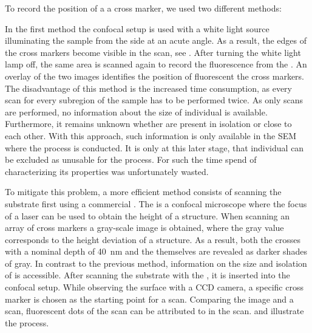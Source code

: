 		To record the position of a \nd \wrt a cross marker, we used two different methods:

		In the first method the confocal setup is used with a white light source illuminating the sample from the side at an acute angle. As a result, the edges of the cross markers become visible in the \fl scan, see . After turning the white light lamp off, the same area is scanned again to record the fluorescence from the \sivs. An overlay of the two images identifies the position of fluorescent \sivs \wrt the cross markers. The disadvantage of this method is the increased time consumption, as every scan for every subregion of the sample has to be performed twice. As only \fl scans are performed, no information about the size of individual \nds is available. Furthermore, it remains unknown whether \nds are present in isolation or close to each other. With this approach, such information is only available in the SEM where the \pp process is conducted. It is only at this later stage, that individual \nds can be excluded as unusable for the \pp process. For such \nds the time spend of characterizing its properties was unfortunately wasted.
		
		To mitigate this problem, a more efficient method consists of scanning the substrate first using a commercial \lsm. The \lsm is a confocal microscope where the focus of a laser can be used to obtain the height of a structure. When scanning an array of cross markers a gray-scale image is obtained, where the gray value corresponds to the height deviation of a structure. As a result, both the crosses with a nominal depth of \SI{40}{\nm} and the \nds themselves are revealed as darker shades of gray. In contrast to the previous method, information on the size and isolation of \nds is accessible. After scanning the substrate with the \lsm, it is inserted into the confocal setup. While observing the surface with a CCD camera, a specific cross marker is chosen as the starting point for a \fl scan. Comparing the \lsm image and a \fl scan, fluorescent dots of the \fl scan can be attributed to \nds in the \lsm scan.  and  illustrate the process.

